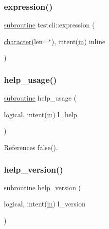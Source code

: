 \subsubsection{\texorpdfstring{expression()}{expression()}}
{\footnotesize\ttfamily \hyperlink{M__stopwatch_83_8txt_acfbcff50169d691ff02d4a123ed70482}{subroutine} testcli\+::expression (\begin{DoxyParamCaption}\item[{\hyperlink{option__stopwatch_83_8txt_abd4b21fbbd175834027b5224bfe97e66}{character}(len=$\ast$), intent(\hyperlink{M__journal_83_8txt_afce72651d1eed785a2132bee863b2f38}{in})}]{inline }\end{DoxyParamCaption})}

\mbox{\label{shell_8f90_a3e09a3b52ee8fb04eeb93fe5761626a8}} 
\subsubsection{\texorpdfstring{help\+\_\+usage()}{help\_usage()}}
{\footnotesize\ttfamily \hyperlink{M__stopwatch_83_8txt_acfbcff50169d691ff02d4a123ed70482}{subroutine} help\+\_\+usage (\begin{DoxyParamCaption}\item[{logical, intent(\hyperlink{M__journal_83_8txt_afce72651d1eed785a2132bee863b2f38}{in})}]{l\+\_\+help }\end{DoxyParamCaption})}



References false().

\mbox{\label{shell_8f90_a39c21619b08a3c22f19e2306efd7f766}} 
\subsubsection{\texorpdfstring{help\+\_\+version()}{help\_version()}}
{\footnotesize\ttfamily \hyperlink{M__stopwatch_83_8txt_acfbcff50169d691ff02d4a123ed70482}{subroutine} help\+\_\+version (\begin{DoxyParamCaption}\item[{logical, intent(\hyperlink{M__journal_83_8txt_afce72651d1eed785a2132bee863b2f38}{in})}]{l\+\_\+version }\end{DoxyParamCaption})}



